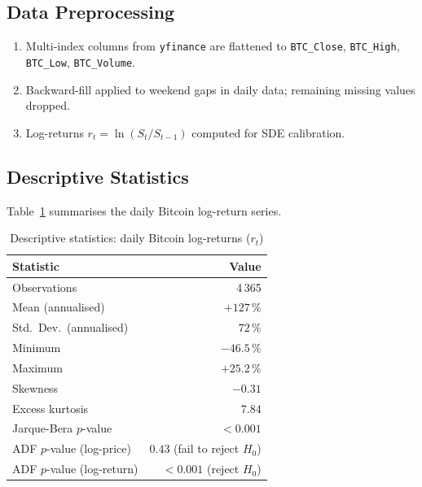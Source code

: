 \documentclass[12pt, a4paper, oneside]{report}
\theoremstyle{plain}
\theoremstyle{definition}
\theoremstyle{remark}
\begin{document}
\subsection{Data Preprocessing}

\begin{enumerate}[leftmargin=1.25cm, label=\arabic*.]
  \item Multi-index columns from \texttt{yfinance} are flattened to
    \texttt{BTC\_Close}, \texttt{BTC\_High}, \texttt{BTC\_Low},
    \texttt{BTC\_Volume}.
  \item Backward-fill applied to weekend gaps in daily data; remaining
    missing values dropped.
  \item Log-returns $r_t = \ln(S_t/S_{t-1})$ computed for SDE calibration.
\end{enumerate}

\subsection{Descriptive Statistics}

Table~\ref{tab:desc_stats} summarises the daily Bitcoin log-return series.

\begin{table}[H]
\begin{singlespace}
\fontsize{10}{11}\selectfont
\caption{Descriptive statistics: daily Bitcoin log-returns ($r_t$)}
\label{tab:desc_stats}
\begin{tabular}{@{}lr@{}}
\toprule
Statistic & Value \\
\midrule
Observations         & 4\,365 \\
Mean (annualised)    & $+127\,\%$ \\
Std.\ Dev.\ (annualised) & $72\,\%$ \\
Minimum              & $-46.5\,\%$ \\
Maximum              & $+25.2\,\%$ \\
Skewness             & $-0.31$ \\
Excess kurtosis      & $7.84$ \\
Jarque-Bera $p$-value & $< 0.001$ \\
ADF $p$-value (log-price)  & $0.43$ (fail to reject $H_0$) \\
ADF $p$-value (log-return) & $< 0.001$ (reject $H_0$) \\
\bottomrule
\end{tabular}
\end{singlespace}
\end{table}
\end{document}
